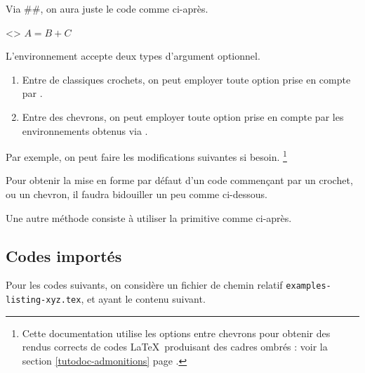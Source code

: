 \begin{tdocexa}
    Via \tdoclatexin##, on aura juste le code comme ci-après.

    \begin{tdoclatex}<>
$A = B + C$
    \end{tdoclatex}
\end{tdocexa}


\begin{tdocexa}[Personnaliser]
	L'environnement  accepte deux types d'argument optionnel.
	\begin{enumerate}
		\item Entre de classiques crochets, on peut employer toute option prise en compte par .

        \item Entre des chevrons, on peut employer toute option prise en compte par les environnements obtenus via .
	\end{enumerate}

	Par exemple, on peut faire les modifications suivantes si besoin.%
	\footnote{
		Cette documentation utilise les options entre chevrons pour obtenir des rendus corrects de codes \LaTeX\ produisant des cadres ombrés : voir la section \ref{tutodoc-admonitions} page \pageref{tutodoc-admonitions}.
	}

\end{tdocexa}

\medskip

\begin{tdocwarn}
    Pour obtenir la mise en forme par défaut d'un code commençant par un crochet, ou un chevron, il faudra bidouiller un peu comme ci-dessous.

    \smallskip

    Une autre méthode consiste à utiliser la primitive  comme ci-après.
\end{tdocwarn}


\subsection{Codes importés}

Pour les codes suivants, on considère un fichier de chemin relatif \verb+examples-listing-xyz.tex+, et ayant le contenu suivant.



